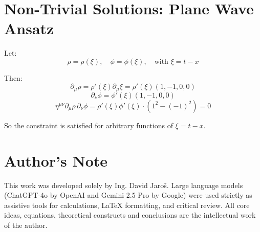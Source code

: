 \documentclass{article}
\begin{document}
\section*{Non-Trivial Solutions: Plane Wave Ansatz}

Let:
\[
\rho = \rho(\xi), \quad \phi = \phi(\xi), \quad \text{with } \xi = t - x
\]

Then:
\[
\partial_\mu \rho = \rho'(\xi) \partial_\mu \xi = \rho'(\xi)(1, -1, 0, 0)
\]
\[
\partial_\nu \phi = \phi'(\xi)(1, -1, 0, 0)
\]
\[
\eta^{\mu\nu} \partial_\mu \rho \, \partial_\nu \phi = \rho'(\xi) \phi'(\xi) \cdot (1^2 - (-1)^2) = 0
\]

So the constraint is satisfied for arbitrary functions of \( \xi = t - x \).


\section*{Author's Note}

This work was developed solely by Ing. David Jaroš.  
Large language models (ChatGPT-4o by OpenAI and Gemini 2.5 Pro by Google) were used strictly as assistive tools for calculations, LaTeX formatting, and critical review.  
All core ideas, equations, theoretical constructs and conclusions are the intellectual work of the author.
\end{document}
